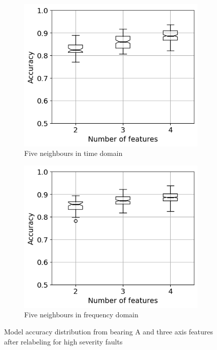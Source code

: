 \begin{figure}[h]
\begin{subfigure}[b]{0.48\textwidth}
    \end{subfigure}
    \hfill
    \begin{subfigure}[b]{0.48\textwidth}
        \includegraphics[width=\textwidth]{assets/results/feature-combinations/TD-3-A-True-False-K5.png}
        \caption{Five neighbours in time domain}
    \end{subfigure}
    \hfill
    \begin{subfigure}[b]{0.48\textwidth}
        \includegraphics[width=\textwidth]{assets/results/feature-combinations/FD-3-A-True-False-K5.png}
        \caption{Five neighbours in frequency domain}
    \end{subfigure}
    \caption{Model accuracy distribution from bearing A and three axis features after relabeling for high severity faults}
    \label{fig:evaluation:model-accuracy-severity}
\end{figure}

